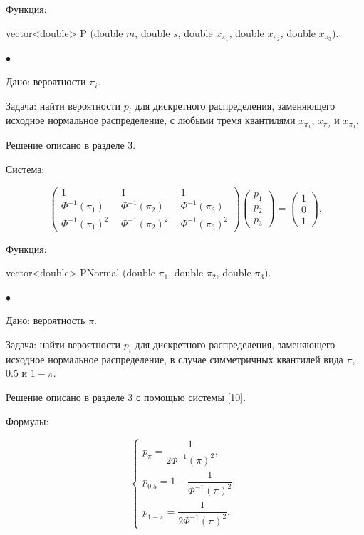 \documentclass[12pt]{article}
\begin{document}
	Функция:
	
	vector<double> P (double $m$, double $s$, double $x_{\pi_{1}}$, double $x_{\pi_{2}}$, double $x_{\pi_{3}}$).
	
	
	$\bullet$
	
	Дано:
	вероятности $\pi_{i}$.
	
	Задача:
	найти вероятности $p_{i}$ для дискретного распределения, заменяющего исходное нормальное распределение, с любыми тремя квантилями $x_{\pi_{1}}$, $x_{\pi_{2}}$ и $x_{\pi_{3}}$.
	
	Решение описано в разделе 3.
	
	Система:
	
	\begin{equation*}
		\begin{pmatrix} 1&1&1\\ 
			\Phi^{-1}(\pi_{1})~~ &  \Phi ^{-1}(\pi_{2})~~  & \Phi ^{-1}(\pi_{3}) \\ 
			\Phi ^{-1}(\pi_{1})^{2}~~&\Phi ^{-1}(\pi_{2})^{2}~~  &\Phi ^{-1}(\pi_{3})^{2}
		\end{pmatrix}
		\begin{pmatrix}p_{1}\\p_{2}\\ p_{3}\end{pmatrix}= \begin{pmatrix}1\\0\\1\end{pmatrix}.
	\end{equation*}
	
	Функция:
	
	vector<double> PNormal (double $\pi_{1}$, double $\pi_{2}$, double $\pi_{3}$).
	
	$\bullet$
	
	Дано:
	вероятность $\pi$.
	
	Задача:
	найти вероятности $p_{i}$ для дискретного распределения, заменяющего исходное нормальное распределение, в случае симметричных квантилей вида  $\pi$, $0.5$ и $1-\pi$.
	
	Решение описано в разделе 3 с помощью системы \eqref{10}.
	
	Формулы:
	
	\begin{equation*}
		\begin{cases}
			p_{\pi} = \displaystyle{\dfrac{1}{2\Phi ^{-1}(\pi)^{2}}},\\ 
			p_{0.5}=\displaystyle{1-\dfrac{1}{\Phi ^{-1}(\pi)^{2}}} , \\ 
			p_{1-\pi}=\displaystyle{\dfrac{1}{2\Phi ^{-1}(\pi)^{2}}}.
		\end{cases}
	\end{equation*}
	
\end{document}
